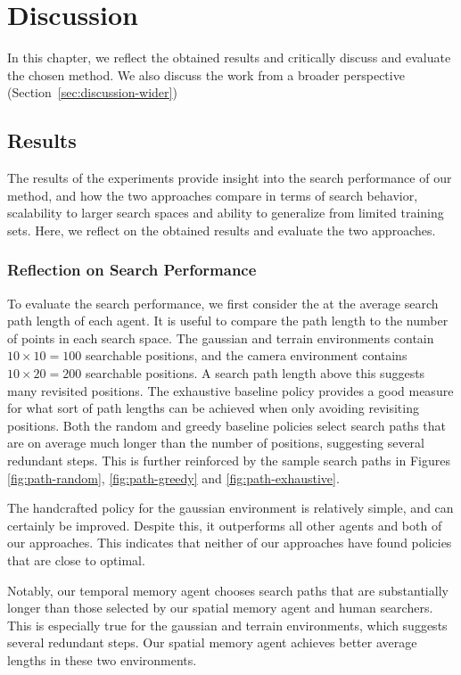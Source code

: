 \chapter{Discussion}
\label{cha:discussion}

In this chapter, we reflect the obtained results and critically discuss and evaluate the chosen method.
We also discuss the work from a broader perspective (Section~\ref{sec:discussion-wider})

\section{Results}
\label{sec:discussion-results}

The results of the experiments provide insight into the search performance of our method,
and how the two approaches compare in terms of search behavior, scalability to larger search spaces and ability to generalize from limited training sets.
Here, we reflect on the obtained results and evaluate the two approaches.

\subsection{Reflection on Search Performance}

To evaluate the search performance, we first consider the at the average search path length of each agent.
It is useful to compare the path length to the number of points in each search space.
The gaussian and terrain environments contain \(10 \times 10 = 100\) searchable positions, and the camera environment contains \(10 \times 20 = 200\) searchable positions.
A search path length above this suggests many revisited positions.
The exhaustive baseline policy provides a good measure for what sort of path lengths can be achieved when only avoiding revisiting positions.
Both the random and greedy baseline policies select search paths that are on average much longer than the number of positions, suggesting several redundant steps.
This is further reinforced by the sample search paths in Figures \ref{fig:path-random}, \ref{fig:path-greedy} and \ref{fig:path-exhaustive}.

The handcrafted policy for the gaussian environment is relatively simple, and can certainly be improved.
Despite this, it outperforms all other agents and both of our approaches.
This indicates that neither of our approaches have found policies that are close to optimal.

Notably, our temporal memory agent chooses search paths that are substantially longer than those selected by our spatial memory agent and human searchers.
This is especially true for the gaussian and terrain environments, which suggests several redundant steps.
Our spatial memory agent achieves better average lengths in these two environments.

